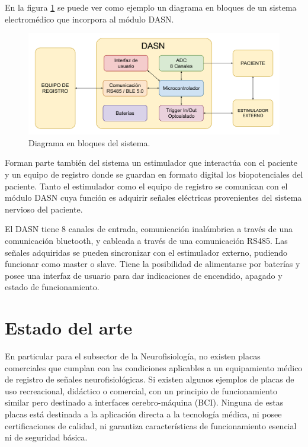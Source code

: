 En la figura \ref{fig:diagBloquesSistema} se puede ver como ejemplo un diagrama en bloques de un sistema electromédico que incorpora al módulo DASN. 

\vspace{1cm}

\begin{figure}[htbp]
	\centering
	\includegraphics[width=1\textwidth]{./Figures/DiagramaEnBloquesDASN.pdf}
	\caption{Diagrama en bloques del sistema.}
	\label{fig:diagBloquesSistema}
\end{figure}

\vspace{1cm}

Forman parte también del sistema un estimulador que interactúa con el paciente y un equipo de registro donde se guardan en formato digital los biopotenciales del paciente. Tanto el estimulador como el equipo de registro se comunican con el módulo DASN cuya función es adquirir señales eléctricas provenientes del sistema nervioso del paciente.
 

El DASN tiene 8 canales de entrada, comunicación inalámbrica a través de una comunicación bluetooth, y cableada a través de una comunicación RS485. Las señales adquiridas se pueden sincronizar con el estimulador externo, pudiendo funcionar como master o slave. Tiene la posibilidad de alimentarse por baterías y posee una interfaz de usuario para dar indicaciones de encendido, apagado y estado de funcionamiento.

\section{Estado del arte}
En particular para el subsector de la Neurofisiología, no existen placas comerciales que cumplan con las condiciones aplicables a un equipamiento médico de registro de señales neurofisiológicas. Si existen algunos ejemplos de placas de uso recreacional, didáctico o comercial, con un principio de funcionamiento similar pero destinado a interfaces cerebro-máquina (BCI). Ninguna de estas placas está destinada a la aplicación directa a la tecnología médica, ni posee certificaciones de calidad, ni garantiza características de funcionamiento esencial ni de seguridad básica.


